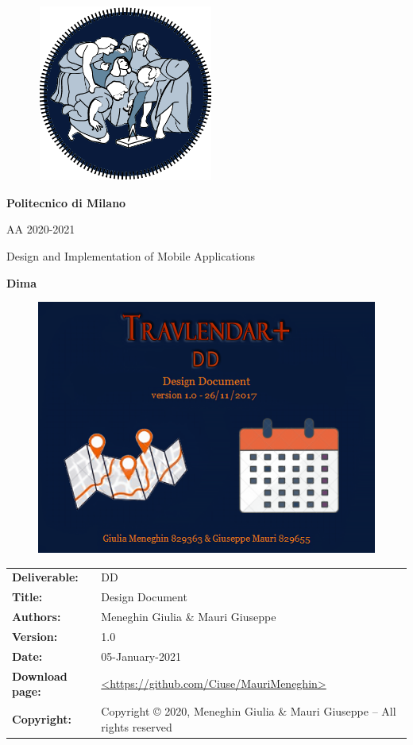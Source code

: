 \documentclass [12pt]{article}
\begin{document}
\begin{figure}[ht!]
\centering
\includegraphics[height=5.8cm,width=5.8cm]{logopoli.png}
\end{figure}
\begin{large}
\centerline{\textbf{Politecnico di Milano} }
\centerline{AA 2020-2021}
\vspace{0.5cm}
\centerline{Design and Implementation of Mobile Applications}
\centerline{\textbf{Dima}}
\end{large}
\begin{figure}[ht!]
\centering
\includegraphics[width=\linewidth]{Immaginecopertina.png}
\end{figure} 

\clearpage

\begin{table}[h!]
\begin{tabu} to \textwidth { X[0.3,r,p] X[0.7,l,p] }
\hline

\textbf{Deliverable:} & DD\\
\textbf{Title:} & Design Document \\
\textbf{Authors:} & Meneghin Giulia \& Mauri Giuseppe \\
\textbf{Version:} & 1.0 \\ 
\textbf{Date:} & 05-January-2021 \\
\textbf{Download page:} & \url{<https://github.com/Ciuse/MauriMeneghin>} \\
\textbf{Copyright:} & Copyright © 2020, Meneghin Giulia \& Mauri Giuseppe – All rights reserved \\
\hline
\end{tabu}
\end{table}
\end{document}
